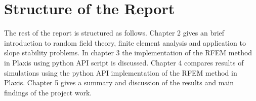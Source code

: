 \section{Structure of the Report}
The rest of the report is structured as follows. Chapter 2 gives an brief introduction to random field theory, finite element analysis and application to slope stability problems. In chapter 3 the implementation of the RFEM method in Plaxis using python API script is discussed. Chapter 4 compares results of simulations using the python API implementation of the RFEM method in Plaxis. Chapter 5 gives a summary and discussion of the results and main findings of the project work.

